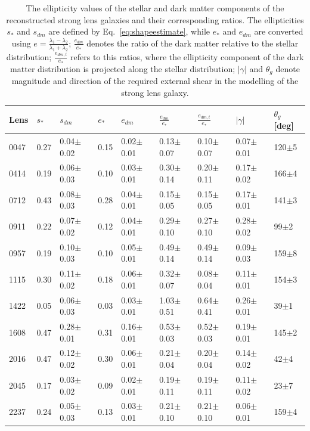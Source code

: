 \documentclass[useAMS,usenatbib]{mn2e}
\begin{document}
\begin{table}
  \begin{center}
    \begin{tabular}{l | l l l l l l l l}
      Lens & $s_{*}$ & $s_{dm}$ & $e_{*}$ & $e_{dm}$ & $\frac{e_{dm}}{e_{*}}$ & $\frac{e_{dm,t}}{e_{*}}$ & $|\gamma|$ & $\theta_{g}$ [deg]\\ \hline
      0047 & 0.27 & 0.04$\pm$0.02 & 0.15 & 0.02$\pm$0.01 & 0.13$\pm$0.07 & 0.10$\pm$0.07 & 0.07$\pm$0.01 & 120$\pm$5 \\
      0414 & 0.19 & 0.06$\pm$0.03 & 0.10 & 0.03$\pm$0.01 & 0.30$\pm$0.14 & 0.20$\pm$0.11 & 0.17$\pm$0.02 & 166$\pm$4 \\
      0712 & 0.43 & 0.08$\pm$0.03 & 0.28 & 0.04$\pm$0.01 & 0.15$\pm$0.05 & 0.15$\pm$0.05 & 0.17$\pm$0.01 & 141$\pm$3 \\
      0911 & 0.22 & 0.07$\pm$0.02 & 0.12 & 0.04$\pm$0.01 & 0.29$\pm$0.10 & 0.27$\pm$0.10 & 0.28$\pm$0.02 & 99$\pm$2 \\
      0957 & 0.19 & 0.10$\pm$0.03 & 0.10 & 0.05$\pm$0.01 & 0.49$\pm$0.14 & 0.49$\pm$0.14 & 0.09$\pm$0.03 & 159$\pm$8 \\
      1115 & 0.30 & 0.11$\pm$0.02 & 0.18 & 0.06$\pm$0.01 & 0.32$\pm$0.07 & 0.08$\pm$0.04 & 0.11$\pm$0.01 & 154$\pm$3 \\
      1422 & 0.05 & 0.06$\pm$0.03 & 0.03 & 0.03$\pm$0.01 & 1.03$\pm$0.51 & 0.64$\pm$0.41 & 0.26$\pm$0.01 & 39$\pm$1 \\
      1608 & 0.47 & 0.28$\pm$0.01 & 0.31 & 0.16$\pm$0.01 & 0.53$\pm$0.03 & 0.52$\pm$0.03 & 0.19$\pm$0.01 & 145$\pm$2 \\
      2016 & 0.47 & 0.12$\pm$0.02 & 0.30 & 0.06$\pm$0.01 & 0.21$\pm$0.04 & 0.20$\pm$0.04 & 0.14$\pm$0.02 & 42$\pm$4 \\
      2045 & 0.17 & 0.03$\pm$0.02 & 0.09 & 0.02$\pm$0.01 & 0.19$\pm$0.11 & 0.19$\pm$0.11 & 0.11$\pm$0.02 & 23$\pm$7 \\
      2237 & 0.24 & 0.05$\pm$0.03 & 0.13 & 0.03$\pm$0.01 & 0.21$\pm$0.10 & 0.21$\pm$0.10 & 0.06$\pm$0.01 & 159$\pm$4 \\
    \end{tabular}
    \caption[width=\linewidth]{The ellipticity values of the stellar and dark matter components of the reconstructed strong lens galaxies and their corresponding ratios. The ellipticities $s_{*}$ and $s_{dm}$ are defined by Eq.~\ref{eq:shapeestimate}, while $e_{*}$ and $e_{dm}$ are converted using $e = \frac{\lambda_1-\lambda_2}{\lambda_1+\lambda_2}$; $\frac{e_{dm}}{e_{*}}$ denotes the ratio of the dark matter relative to the stellar distribution; $\frac{e_{dm,t}}{e_{*}}$ refers to this ratios, where the ellipticity component of the dark matter distribution is projected along the stellar distribution; $|\gamma|$ and $\theta_{g}$ denote magnitude and direction of the required external shear in the modelling of the strong lens galaxy.}
    \label{tab:ellipratios}
  \end{center}
\end{table}
\end{document}
